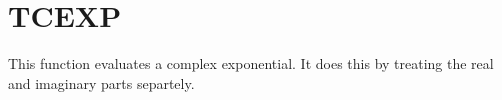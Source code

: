 \section{TCEXP}
\label{sect:tcexp}

\noindent This function evaluates a complex exponential. It does this by
treating the real and imaginary parts separtely.\\
